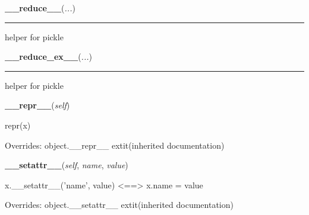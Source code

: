     \label{object:__reduce__}

    \vspace{0.5ex}

    \begin{boxedminipage}{\textwidth}

    \raggedright \textbf{\_\_reduce\_\_}(\textit{...})

    \vspace{-1.5ex}

    \rule{\textwidth}{0.5\fboxrule}
    helper for pickle

    \vspace{1ex}

    \end{boxedminipage}

    \label{object:__reduce_ex__}

    \vspace{0.5ex}

    \begin{boxedminipage}{\textwidth}

    \raggedright \textbf{\_\_reduce\_ex\_\_}(\textit{...})

    \vspace{-1.5ex}

    \rule{\textwidth}{0.5\fboxrule}
    helper for pickle

    \vspace{1ex}

    \end{boxedminipage}

    \vspace{0.5ex}

    \begin{boxedminipage}{\textwidth}

    \raggedright \textbf{\_\_repr\_\_}(\textit{self})

    repr(x)

    \vspace{1ex}

      Overrides: object.\_\_repr\_\_ 	extit{(inherited documentation)}

    \end{boxedminipage}

    \vspace{0.5ex}

    \begin{boxedminipage}{\textwidth}

    \raggedright \textbf{\_\_setattr\_\_}(\textit{self}, \textit{name}, \textit{value})

    x.\_\_setattr\_\_('name', value) {\textless}=={\textgreater} x.name = 
    value

    \vspace{1ex}

      Overrides: object.\_\_setattr\_\_ 	extit{(inherited documentation)}

    \end{boxedminipage}


